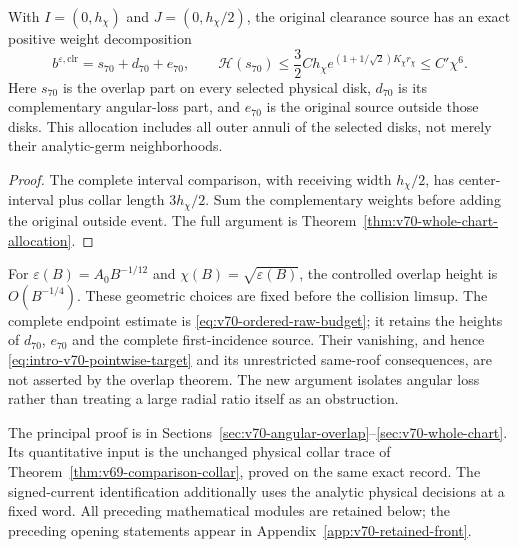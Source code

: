 \begin{leadtheorem}
\label{thm:intro-v70-whole-chart}
With $I=(0,h_\chi)$ and $J=(0,h_\chi/2)$, the original clearance
source has an exact positive weight decomposition
\[
 b^{\varepsilon,\mathrm{clr}}=s_{70}+d_{70}+e_{70},\qquad
 \mathcal H(s_{70})\le\frac32Ch_\chi
                   e^{(1+1/\sqrt2)K_\chi r_\chi}\le C'\chi^6.
\]
Here $s_{70}$ is the overlap part on every selected physical disk,
$d_{70}$ is its complementary angular-loss part, and $e_{70}$ is
the original source outside those disks. This allocation includes all
outer annuli of the selected disks, not merely their analytic-germ
neighborhoods.
\end{leadtheorem}
\begin{proof}
The complete interval comparison, with receiving width $h_\chi/2$,
has center-interval plus collar length $3h_\chi/2$. Sum the
complementary weights before adding the original outside event.
The full argument is Theorem~\ref{thm:v70-whole-chart-allocation}.
\end{proof}

For $\varepsilon(B)=A_0B^{-1/12}$ and
$\chi(B)=\sqrt{\varepsilon(B)}$, the controlled overlap height is
$O(B^{-1/4})$. These geometric choices are fixed before the collision
limsup. The complete endpoint estimate is
\eqref{eq:v70-ordered-raw-budget}; it retains the heights of $d_{70}$,
$e_{70}$ and the complete first-incidence source. Their vanishing,
and hence \eqref{eq:intro-v70-pointwise-target} and its unrestricted
same-roof consequences, are not asserted by the overlap theorem.
The new argument isolates angular loss rather than treating a large
radial ratio itself as an obstruction.

The principal proof is in
Sections~\ref{sec:v70-angular-overlap}--\ref{sec:v70-whole-chart}.
Its quantitative input is the unchanged physical collar trace of
Theorem~\ref{thm:v69-comparison-collar}, proved on the same exact
record. The signed-current identification additionally uses the
analytic physical decisions at a fixed word. All preceding mathematical
modules are retained below; the preceding opening statements appear
in Appendix~\ref{app:v70-retained-front}.

